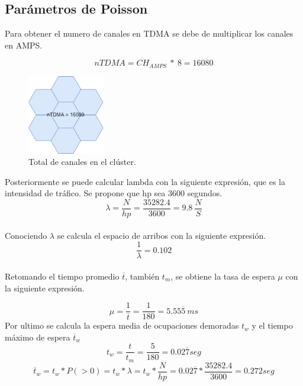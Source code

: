 \documentclass[11pt,letterpaper]{article}
\begin{document}
\newpage
\subsection{Parámetros de Poisson}
Para obtener el numero de canales en TDMA se debe de multiplicar los canales 
en AMPS.

\begin{equation}
    nTDMA=CH_{AMPS} \ * \ 8=16080
\end{equation}

\begin{figure}[ht]
    \centering
    \includegraphics[width=0.3\textwidth]{imagenes/cluster.png}
    \caption{Total de canales en el clúster.}
\end{figure}

Posteriormente se puede calcular lambda con la siguiente expresión, que es la 
intensidad de tráfico. Se propone que hp sea 3600 segundos.
\begin{equation}
    \lambda=\frac{N}{hp}=\frac{35282.4}{3600}=9.8 \ \frac{N}{S}
\end{equation}
\\
Conociendo $\lambda$ se calcula el espacio de arribos con la siguiente expresión.
\begin{equation}
    \frac{1}{\lambda}=0.102
\end{equation}
\\
Retomando el tiempo promedio $\overline{t}$, también $t_m$, se obtiene la tasa de espera $\mu$ 
con la siguiente expresión. 

\begin{equation}
    \mu=\frac{1}{\overline{t}}=\frac{1}{180}=5.55\overline{5} \ ms
\end{equation}
Por ultimo se calcula la espera media de ocupaciones demoradas $t_w$ y el tiempo máximo 
de espera $\overline{t}_w$
\begin{equation}
    t_w=\frac{t}{t_m}=\frac{5}{180}=0.02\overline{7} seg
\end{equation}
\begin{equation}
    \overline{t}_w=t_w*P(>0)=t_w*\lambda=t_w*\frac{N}{hp}=0.02\overline{7}*\frac{35282.4}{3600}=0.272seg
\end{equation}
\end{document}
